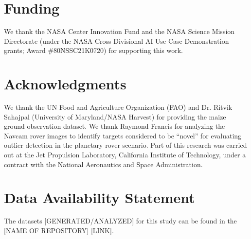 \documentclass[utf8]{frontiersFPHY} %
\begin{document}
\section*{Funding}
We thank the NASA Center Innovation Fund 
and the NASA Science Mission Directorate 
(under the NASA Cross-Divisional AI Use Case Demonstration grants;
Award \#80NSSC21K0720) for supporting this work. 

\section*{Acknowledgments}
We thank the UN Food and Agriculture Organization (FAO) and Dr. Ritvik Sahajpal
(University of Maryland/NASA Harvest) for providing the maize ground
 observation dataset. 
%
We thank Raymond Francis for analyzing the Navcam 
rover images to identify targets considered to be ``novel'' for evaluating
outlier detection in the planetary rover scenario.
%
Part of this research was carried out at the Jet Propulsion
Laboratory, California Institute of Technology, under a contract with
the National Aeronautics and Space Administration.




\section*{Data Availability Statement}
The datasets [GENERATED/ANALYZED] for this study can be found in the [NAME OF REPOSITORY] [LINK]. 
\end{document}

